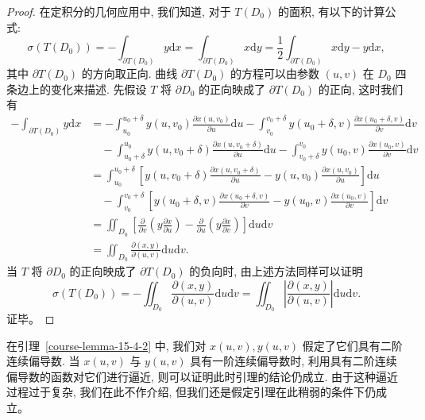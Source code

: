\documentclass[12pt,fontset=fandol]{ctexart}
\begin{document}
\begin{proof}\quad 在定积分的几何应用中, 我们知道, 对于 $T(D_0)$ 的面积, 有以下的计算公式:
\[
  \sigma(T(D_0))=-\int_{\partial T(D_0)}y\mathrm dx
  =\int_{\partial T(D_0)}x\mathrm dy
  =\frac12\int_{\partial T(D_0)}x\mathrm dy-y\mathrm dx,
\]
其中 $\partial T(D_0)$ 的方向取正向. 曲线 $\partial T(D_0)$ 的方程可以由参数 $(u,v)$ 在 $D_0$ 四条边上的变化来描述. 先假设 $T$ 将 $\partial D_0$ 的正向映成了 $\partial T(D_0)$ 的正向, 这时我们有
\[
\begin{aligned}
  -\int_{\partial T(D_0)}y\mathrm dx
  &=-\int_{u_0}^{u_0+\delta}y(u,v_0)\frac{\partial x(u,v_0)}{\partial u}\mathrm du
    -\int_{v_0}^{v_0+\delta}y(u_0+\delta,v)\frac{\partial x(u_0+\delta,v)}{\partial v}\mathrm dv\\
  &\quad-\int_{u_0+\delta}^{u_0}y(u,v_0+\delta)\frac{\partial x(u,v_0+\delta)}{\partial u}\mathrm du
    -\int_{v_0+\delta}^{v_0}y(u_0,v)\frac{\partial x(u_0,v)}{\partial v}\mathrm dv\\
  &=\int_{u_0}^{u_0+\delta}
    \left[y(u,v_0+\delta)\frac{\partial x(u,v_0+\delta)}{\partial u}
    -y(u,v_0)\frac{\partial x(u,v_0)}{\partial u}\right]\mathrm du\\
  &\quad-\int_{v_0}^{v_0+\delta}
    \left[y(u_0+\delta,v)\frac{\partial x(u_0+\delta,v)}{\partial v}
    -y(u_0,v)\frac{\partial x(u_0,v)}{\partial v}\right]\mathrm dv\\
  &=\iint_{D_0}\left[
    \frac{\partial}{\partial v}\left(y\frac{\partial x}{\partial u}\right)
    -\frac{\partial}{\partial u}\left(y\frac{\partial x}{\partial v}\right)
    \right]\mathrm du\mathrm dv\\
  &=\iint_{D_0}\frac{\partial(x,y)}{\partial(u,v)}\mathrm du\mathrm dv.
\end{aligned}
\]
当 $T$ 将 $\partial D_0$ 的正向映成了 $\partial T(D_0)$ 的负向时, 由上述方法同样可以证明
\[
  \sigma(T(D_0))=-\iint_{D_0}\frac{\partial(x,y)}{\partial(u,v)}\mathrm du\mathrm dv
  =\iint_{D_0}\left|\frac{\partial(x,y)}{\partial(u,v)}\right|\mathrm du\mathrm dv.
\]
证毕。

\end{proof}
\begin{remark}\quad 在引理~\ref{course-lemma-15-4-2}  中, 我们对 $x(u,v),y(u,v)$ 假定了它们具有二阶连续偏导数. 当 $x(u,v)$ 与 $y(u,v)$ 具有一阶连续偏导数时, 利用具有二阶连续偏导数的函数对它们进行逼近, 则可以证明此时引理的结论仍成立. 由于这种逼近过程过于复杂, 我们在此不作介绍, 但我们还是假定引理在此稍弱的条件下仍成立。

\end{remark}
\end{document}
